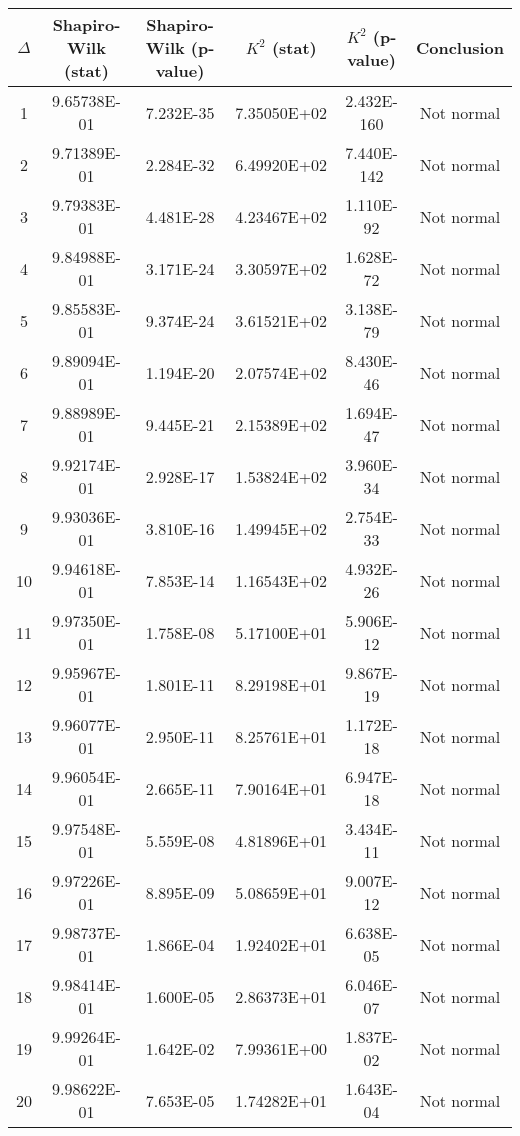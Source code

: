 \begin{table}[h]
	\begin{tabular}{|c|c|c|c|c|c|}
		\hline
		$\Delta$ &  Shapiro-Wilk (stat) & Shapiro-Wilk (p-value) & $K^2$ (stat) & $K^2$ (p-value) & Conclusion\\\hline
		\hline
		1 & 9.65738E-01 & 7.232E-35 & 7.35050E+02 & 2.432E-160 & Not normal\\\hline
		2 & 9.71389E-01 & 2.284E-32 & 6.49920E+02 & 7.440E-142 & Not normal\\\hline
		3 & 9.79383E-01 & 4.481E-28 & 4.23467E+02 & 1.110E-92 & Not normal\\\hline
		4 & 9.84988E-01 & 3.171E-24 & 3.30597E+02 & 1.628E-72 & Not normal\\\hline
		5 & 9.85583E-01 & 9.374E-24 & 3.61521E+02 & 3.138E-79 & Not normal\\\hline
		6 & 9.89094E-01 & 1.194E-20 & 2.07574E+02 & 8.430E-46 & Not normal\\\hline
		7 & 9.88989E-01 & 9.445E-21 & 2.15389E+02 & 1.694E-47 & Not normal\\\hline
		8 & 9.92174E-01 & 2.928E-17 & 1.53824E+02 & 3.960E-34 & Not normal\\\hline
		9 & 9.93036E-01 & 3.810E-16 & 1.49945E+02 & 2.754E-33 & Not normal\\\hline
		10 & 9.94618E-01 & 7.853E-14 & 1.16543E+02 & 4.932E-26 & Not normal\\\hline
		11 & 9.97350E-01 & 1.758E-08 & 5.17100E+01 & 5.906E-12 & Not normal\\\hline
		12 & 9.95967E-01 & 1.801E-11 & 8.29198E+01 & 9.867E-19 & Not normal\\\hline
		13 & 9.96077E-01 & 2.950E-11 & 8.25761E+01 & 1.172E-18 & Not normal\\\hline
		14 & 9.96054E-01 & 2.665E-11 & 7.90164E+01 & 6.947E-18 & Not normal\\\hline
		15 & 9.97548E-01 & 5.559E-08 & 4.81896E+01 & 3.434E-11 & Not normal\\\hline
		16 & 9.97226E-01 & 8.895E-09 & 5.08659E+01 & 9.007E-12 & Not normal\\\hline
		17 & 9.98737E-01 & 1.866E-04 & 1.92402E+01 & 6.638E-05 & Not normal\\\hline
		18 & 9.98414E-01 & 1.600E-05 & 2.86373E+01 & 6.046E-07 & Not normal\\\hline
		19 & 9.99264E-01 & 1.642E-02 & 7.99361E+00 & 1.837E-02 & Not normal\\\hline
		20 & 9.98622E-01 & 7.653E-05 & 1.74282E+01 & 1.643E-04 & Not normal\\\hline

\end{tabular}
\end{table}
